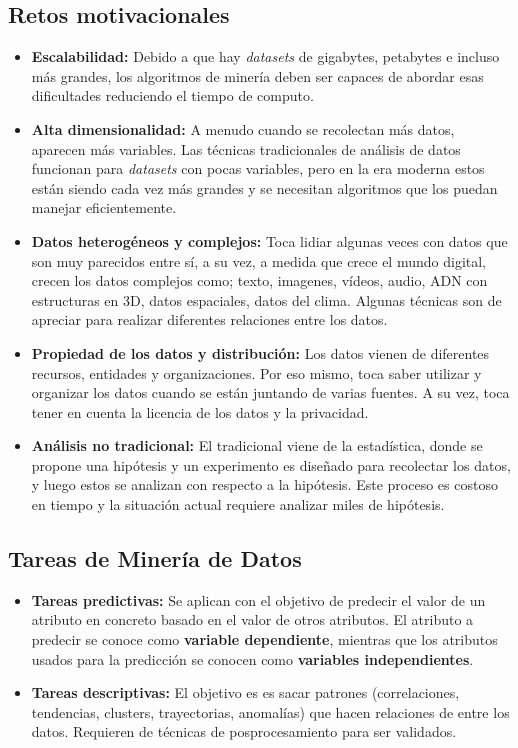 \documentclass{article}
\begin{document}
\subsection{Retos motivacionales}
\begin{itemize}
  \item \textbf{Escalabilidad:} Debido a que hay \textit{datasets} de gigabytes, petabytes e incluso más grandes, los algoritmos de minería deben ser capaces de abordar esas dificultades reduciendo el tiempo de computo.
  \item \textbf{Alta dimensionalidad:} A menudo cuando se recolectan más datos, aparecen más variables. Las técnicas tradicionales de análisis de datos funcionan para \textit{datasets} con pocas variables, pero en la era moderna estos están siendo cada vez más grandes y se necesitan algoritmos que los puedan manejar eficientemente.
  \item \textbf{Datos heterogéneos y complejos:} Toca lidiar algunas veces con datos que son muy parecidos entre sí, a su vez, a medida que crece el mundo digital, crecen los datos complejos como; texto, imagenes, vídeos, audio, ADN con estructuras en 3D, datos espaciales, datos del clima. Algunas técnicas son de apreciar para realizar diferentes relaciones entre los datos.
  \item \textbf{Propiedad de los datos y distribución:} Los datos vienen de diferentes recursos, entidades y organizaciones. Por eso mismo, toca saber utilizar y organizar los datos cuando se están juntando de varias fuentes. A su vez, toca tener en cuenta la licencia de los datos y la privacidad.
  \item \textbf{Análisis no tradicional:} El tradicional viene de la estadística, donde se propone una hipótesis y un experimento es diseñado para recolectar los datos, y luego estos se analizan con respecto a la hipótesis. Este proceso es costoso en tiempo y la situación actual requiere analizar miles de hipótesis.
\end{itemize}   

\subsection{Tareas de Minería de Datos}

\begin{itemize}
  \item \textbf{Tareas predictivas:} Se aplican con el objetivo de predecir el valor de un atributo en concreto basado en el valor de otros atributos. El atributo a predecir se conoce como \textbf{variable dependiente}, mientras que los atributos usados para la predicción se conocen como \textbf{variables independientes}.
  \item \textbf{Tareas descriptivas:} El objetivo es es sacar patrones (correlaciones, tendencias, clusters, trayectorias, anomalías) que hacen relaciones de entre los datos. Requieren de técnicas de posprocesamiento para ser validados.
\end{itemize}
\end{document}
